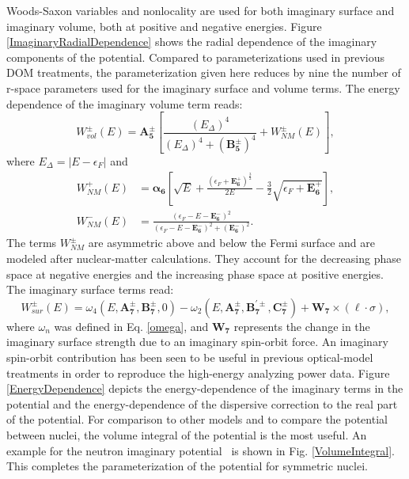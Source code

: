 Woods-Saxon variables and nonlocality are used for both imaginary surface and imaginary volume,
both at positive and
negative energies. Figure \ref{ImaginaryRadialDependence} shows the radial
dependence of the imaginary components of the potential.
Compared to parameterizations used in previous DOM treatments,
the parameterization given here reduces by nine the number of r-space
parameters used for the imaginary surface and volume terms.
The energy dependence of the imaginary volume term reads:
\begin{equation} \label{ImagVolume}
    W_{vol}^{\pm}(E) = \bm{A_{5}^{\pm}}\left[\frac{(E_{\Delta})^{4}}
    {(E_{\Delta})^{4}+(\bm{B_{5}^{\pm}})^{4}} + W_{NM}^{\pm}(E)\right],
\end{equation}
where $E_{\Delta} = |E-\epsilon_{F}|$ and
\begin{equation}
    \begin{split}
        W_{NM}^{+}(E) & = {\bm{\alpha_{6}}}\left[\sqrt{E} +
            \frac{(\epsilon_{F}+\bm{E^{+}_{6}})^{\frac{3}{2}}}{2E}
        -\frac{3}{2}\sqrt{\epsilon_{F}+\bm{E^{+}_{6}}}\right],\\
        W_{NM}^{-}(E) & = \frac{(\epsilon_{F}-E-\bm{E_{6}^{-}})^{2}}
        {(\epsilon_{F}-E-\bm{E_{6}^{-}})^{2}+(\bm{E_{6}^{-}})^{2}}.
        \end{split}
    \end{equation}
The terms $W_{NM}^{\pm}$ are asymmetric above and below the Fermi surface and are modeled after
nuclear-matter calculations. They account for the decreasing phase space at negative energies
and the increasing phase space at positive energies. The imaginary surface terms read:
\begin{equation} \label{ImagSurface}
    W_{sur}^{\pm}(E) = \omega_{4}(E, \bm{A_{7}^{\pm}}, \bm{B_{7}^{\pm}}, 0)
    - \omega_{2}(E, \bm{A_{7}^{\pm}}, \bm{B_{7}^{'\pm}}, \bm{C_{7}^{\pm}}) + 
    \bm{W_{7}}\times(\ell\cdot\sigma),
\end{equation}
where $\omega_{n}$ was defined in Eq. \ref{omega}, and $\bm{W_{7}}$ represents the change in the
imaginary surface strength due to an imaginary spin-orbit force. An imaginary spin-orbit
contribution has been seen to be useful in previous optical-model treatments in order to reproduce 
the high-energy analyzing power data. Figure \ref{EnergyDependence} depicts the
energy-dependence of the imaginary terms in the potential and the
energy-dependence of the dispersive correction to the real part of the
potential. For comparison to other models and to compare the potential between
nuclei, the volume integral of the potential is the most useful. An example 
for the neutron imaginary potential \caForty\ is shown in Fig. \ref{VolumeIntegral}.
This completes the parameterization of the potential for symmetric nuclei.

